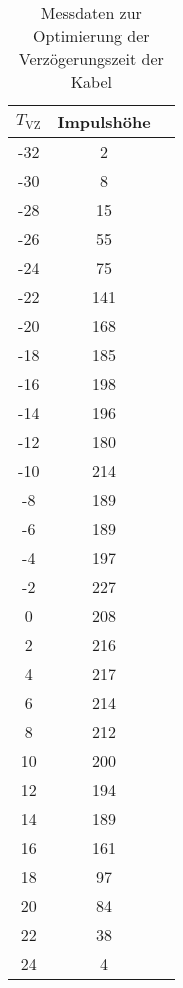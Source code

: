 \begin{table}[h!]
  \centering
  \caption{Messdaten zur Optimierung der Verzögerungszeit der Kabel}
  \label{tab:kalibrierung}
  \begin{tabular}{c c c}
    \toprule
      $T_{\text{VZ}}$ & Impulshöhe \\
      \midrule
      -32   &   2     \\
      -30   &   8     \\
      -28   &   15    \\
      -26   &   55    \\
      -24   &   75    \\
      -22   &   141   \\
      -20   &   168   \\
      -18   &   185   \\
      -16   &   198   \\
      -14   &   196   \\
      -12   &   180   \\
      -10   &   214   \\
      -8    &   189   \\
      -6    &   189   \\
      -4    &   197   \\
      -2    &   227   \\
      0     &   208   \\
      2     &   216   \\
      4     &   217   \\
      6     &   214   \\
      8     &   212   \\
      10    &   200   \\
      12    &   194   \\
      14    &   189   \\
      16    &   161   \\
      18    &   97    \\
      20    &   84    \\
      22    &   38    \\
      24    &   4     \\

    \bottomrule
  \end{tabular}
\end{table}

%
